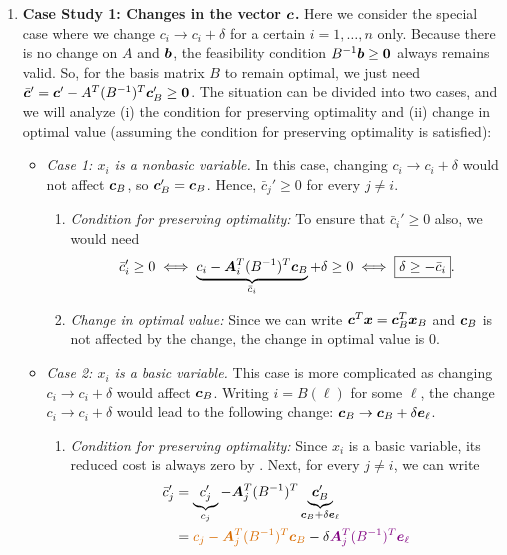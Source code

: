 \begin{enumerate}
\item \textbf{Case Study 1: Changes in the vector \(\bm{c}\).} Here we
consider the special case where we change \(c_i\to c_i+\delta\) for a certain
\(i=1,\dotsc,n\) only. Because there is no change on \(A\) and \(\bm{b}\),
the feasibility condition \(B^{-1}\bm{b}\ge\bm{0}\) always remains valid.
So, for the basis matrix \(B\) to remain optimal, we just need
\(\bar{\bm{c}}'=\bm{c}'-A^{T}(B^{-1})^{T}\bm{c}_{B}'\ge\bm{0}\). The situation
can be divided into two cases, and we will analyze (i) the condition for
preserving optimality and (ii) change in optimal value (assuming the condition
for preserving optimality is satisfied):
\begin{itemize}
\item \emph{Case 1: \(x_i\) is a nonbasic variable.} In this case, changing
\(c_i\to c_i+\delta\) would not affect \(\bm{c}_{B}\), so
\(\bm{c}_{B}'=\bm{c}_{B}\). Hence, \(\bar{c}_j'\ge 0\) for every \(j\ne i\).
\begin{enumerate}[label={(\arabic*)}]
\item \emph{Condition for preserving optimality:} To ensure that
\(\bar{c}_i'\ge 0\) also, we would need
\[
\bar{c}_i'\ge 0
\iff \underbrace{c_i-\bm{A}_i^{T}(B^{-1})^{T}\bm{c}_{B}}_{\bar{c}_i}+\delta\ge 0
\iff \boxed{\delta\ge -\bar{c}_i}.
\]
\item \emph{Change in optimal value:} Since we can write
\(\bm{c}^{T}\bm{x}=\bm{c}_{B}^{T}\bm{x}_{B}\) and \(\bm{c}_{B}\) is
not affected by the change, the change in optimal value is \(\boxed{0}\).
\end{enumerate}
\item \emph{Case 2: \(x_i\) is a basic variable.} This case is more complicated
as changing \(c_i\to c_i+\delta\) would affect \(\bm{c}_{B}\). Writing
\(i=B(\ell)\) for some \(\ell\), the change \(c_i\to c_i+\delta\) would lead to
the following change: \(\bm{c}_{B}\to\bm{c}_{B}+\delta\bm{e}_{\ell}\).
\begin{enumerate}[label={(\arabic*)}]
\item \emph{Condition for preserving optimality:} Since \(x_i\) is a basic
variable, its reduced cost is always zero by .
Next, for every \(j\ne i\), we can write
\begin{align*}
\bar{c}_j'&=\underbrace{c_j'}_{c_j}-\vect{A}_j^{T}(B^{-1})^{T}
\underbrace{\vect{c}_{B}'}_{\vect{c}_{B}+\delta\vect{e}_{\ell}} \\
&=\orc{c_j-\vect{A}_j^{T}(B^{-1})^{T}\vect{c}_{B}}-\delta\vc{\vect{A}_j^{T}(B^{-1})^{T}\vect{e}_{\ell}} \\

\end{align*}
\end{enumerate}
\end{itemize}
\end{enumerate}
